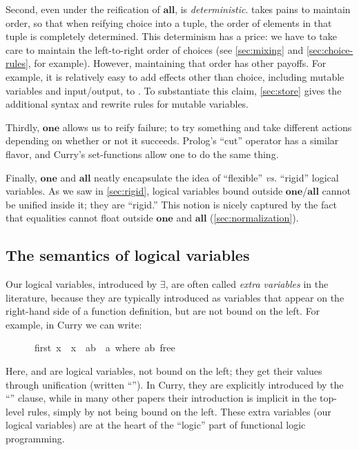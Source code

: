 \documentclass[acmsmall]{acmart}
\newcommand{\vs}{\emph{vs.}\xspace}
\begin{document}
Second, even under the reification of \ensuremath{\textbf{all}},
\versecalc{} is \emph{deterministic}.
\versecalc{} takes pains to maintain order, so that
when reifying choice into a tuple, the order of elements in that
tuple is completely determined.
This determinism has a price: we have to take care to maintain the
left-to-right order of choices (see \cref{sec:mixing} and \cref{sec:choice-rules}, for example).
However, maintaining that order has other payoffs. For example, it is relatively easy to add
effects other than choice, including mutable variables and input/output, to \versecalc{}.
To substantiate this claim, \cref{sec:store} gives the additional syntax and rewrite rules
for mutable variables.

Thirdly, \ensuremath{\textbf{one}} allows us to reify failure; to try something and take different actions
depending on whether or not it succeeds. Prolog's ``cut'' operator has a similar flavor,
and Curry's set-functions allow one to do the same thing.

Finally, \ensuremath{\textbf{one}} and \ensuremath{\textbf{all}} neatly encapsulate the idea of ``flexible'' {\vs} ``rigid'' logical variables.
As we saw in \cref{sec:rigid}, logical variables bound outside \ensuremath{\textbf{one}}/\ensuremath{\textbf{all}} cannot be unified inside it;
they are ``rigid.''  This notion is nicely captured by the fact that equalities
cannot float outside \ensuremath{\textbf{one}} and \ensuremath{\textbf{all}} (\cref{sec:normalization}).

\subsection{The semantics of logical variables} \label{sec:magical}

Our logical variables, introduced by \ensuremath{\exists{}}, are often called
\emph{extra variables} in the literature, because they
are typically introduced as variables that appear on the right-hand side of a
function definition, but are not bound on the left.  For example, in Curry we can write:
\begin{tabbing}\ttfamily
~~~~~~first~x~~x~~ab~~a~where~ab~free
\end{tabbing}
Here,  and  are logical variables, not bound on the left; they
get their values through unification (written ``'').   In Curry, they are explicitly introduced
by the ``'' clause, while in many other papers their
introduction is implicit in the top-level rules, simply by not being bound
on the left.  These extra variables (our logical variables) are
at the heart of the ``logic'' part of functional logic programming.
\end{document}
